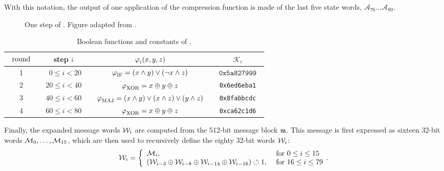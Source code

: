 \noindent
With this notation, the output of one application of the compression function is made of the last five state words, $\mathcal{A}_{76}\ldots \mathcal{A}_{80}$.

\begin{figure}[ht]
\begin{center}

\caption{One step of \shaone. Figure adapted from \cite{TiKZ:Cryptographers}.\label{fig:sha1_step}}
\end{center}
\end{figure}


\renewcommand{\arraystretch}{1.2}
\begin{table}[ht]
\caption{\label{tab:sha_spec}Boolean functions and constants of \shaone.}
\begin{center}
\begin{tabular}{c c c c} \toprule
$\;\; \textnormal{round} \;\;$ & step $i$ & $\operatorname{\varphi}_i(x,y,z)$ &  $\mathcal{K}_i$ \\ \midrule
1 & $\;\;  \:\:0 \leq i <  20 \;\;$  & $\operatorname{\varphi}_{\text{IF}} = (x \wedge y) \vee (\neg x \wedge z)$ & $\;\; \texttt{0x5a827999} \;\;$ \\
2 & $20 \leq i <  40$ & $\operatorname{\varphi}_{\text{XOR}} = x \oplus y \oplus z$ & \texttt{0x6ed6eba1} \\
3 & $40 \leq i <  60$ & $\;\;  \operatorname{\varphi}_{\text{MAJ}} = (x \wedge y) \vee (x \wedge z) \vee (y \wedge z) \;\;$  & \texttt{0x8fabbcdc} \\
4 & $60 \leq i <  80$ & $\operatorname{\varphi}_{\text{XOR}} = x \oplus y \oplus z $ & \texttt{0xca62c1d6} \\
\bottomrule
\end{tabular}
\end{center}
\end{table}

\noindent
Finally, the expanded message words $\mathcal{W}_i$ are computed from the 512-bit message block $\mathfrak{m}$. This message is first expressed as
sixteen 32-bit words $\mathcal{M}_0,\ldots, \mathcal{M}_{15}$, which are then used to recursively define the eighty 32-bit words $\mathcal{W}_i$:
\begin{equation}
\label{eq:exp_mess}
\mathcal{W}_i=
\left\{
\begin{array}{ll}
\mathcal{M}_i, & \textnormal{ for } 0\leq i\leq 15 \\
(\mathcal{W}_{i-3} \oplus \mathcal{W}_{i-8} \oplus \mathcal{W}_{i-14} \oplus \mathcal{W}_{i-16}) \circlearrowleft 1, & \textnormal{ for } 16\leq i\leq 79
\end{array}.
\right.
\end{equation}

